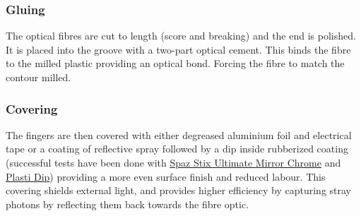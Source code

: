 \subsubsection{Gluing}
The optical fibres are cut to length (score and breaking) and the end is polished. It is placed into the groove with a two-part optical cement. This binds the fibre to the milled plastic providing an optical bond. Forcing the fibre to match the contour milled.


\subsubsection{Covering}
The fingers are then covered with either degreased aluminium foil and electrical tape or a coating of reflective spray followed by a dip inside rubberized coating (successful tests have been done with \href{http://www.hobbyrecreationproducts.com/collections/spazstix-ultimate-mirror-chrome}{Spaz Stix Ultimate Mirror Chrome} and \href{https://plastidip.com/}{Plasti Dip}) providing a more even surface finish and reduced labour. This covering shields external light, and provides higher efficiency by capturing stray photons by reflecting them back towards the fibre optic. 

\pagebreak
